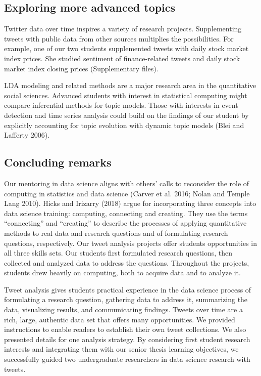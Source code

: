 \documentclass[
]{article}
\begin{document}
\hypertarget{exploring-more-advanced-topics}{%
\subsection{Exploring more advanced topics}\label{exploring-more-advanced-topics}}

Twitter data over time inspires a variety of research projects. Supplementing
tweets with public data from other sources multiplies the possibilities. For example,
one of our two students supplemented tweets with daily stock market index prices.
She studied sentiment of finance-related tweets and daily stock market index
closing prices (Supplementary files).

LDA modeling and related methods are a major research area in the
quantitative social sciences. Advanced students with interest in statistical computing might
compare inferential methods for topic models. Those with interests in event detection
and time series analysis could build on the findings of our student by explicitly accounting
for topic evolution with dynamic topic models (Blei and Lafferty 2006).

\hypertarget{concluding-remarks}{%
\subsection{Concluding remarks}\label{concluding-remarks}}

Our mentoring in data science aligns with others' calls to reconsider
the role of computing in statistics
and data science (Carver et al. 2016; Nolan and Temple Lang 2010). Hicks and Irizarry (2018) argue for
incorporating three concepts into data science training:
computing, connecting and creating.
They use the terms ``connecting'' and ``creating'' to describe the processes of applying
quantitative methods to real data and research questions and of formulating research
questions, respectively. Our tweet analysis projects offer students opportunities in all
three skills sets. Our students first formulated research questions, then collected and
analyzed data to address the questions. Throughout the projects, students
drew heavily on computing, both to acquire data and to analyze it.

Tweet analysis gives students practical experience in the data science process of
formulating a research question, gathering data to address it, summarizing the
data, visualizing results, and communicating findings. Tweets over time are a rich, large,
authentic data set that offers many opportunities.
We provided instructions to enable readers to establish their own tweet collections.
We also presented details for one analysis strategy.
By considering first student research interests and integrating them with our
senior thesis learning objectives, we successfully guided two undergraduate
researchers in data science research with tweets.
\end{document}
